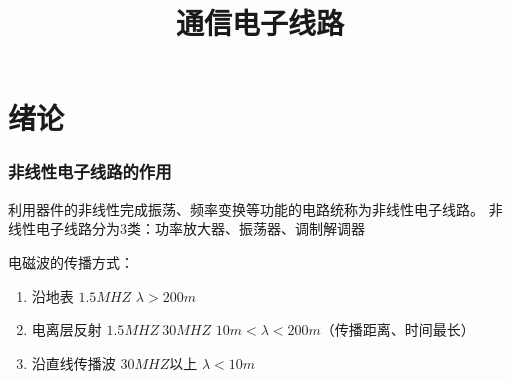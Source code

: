\documentclass[10pt]{article}
\begin{document}
    \title{通信电子线路}
	\author{}
	\maketitle
	\newpage
    \part{绪论}
    \section{非线性电子线路的作用}
    利用器件的非线性完成振荡、频率变换等功能的电路统称为非线性电子线路。
    非线性电子线路分为3类：功率放大器、振荡器、调制解调器

    \par
   电磁波的传播方式：
   \begin{enumerate}
    \item 沿地表 \quad $1.5MHZ$ \quad $\lambda > 200m$
    \item 电离层反射 \quad $1.5MHZ ~ 30MHZ$ \quad $10 m <\lambda < 200m$\quad （传播距离、时间最长）
    \item 沿直线传播波 \quad $30MHZ$以上 \quad $\lambda < 10m $
   \end{enumerate} 
\end{document}
